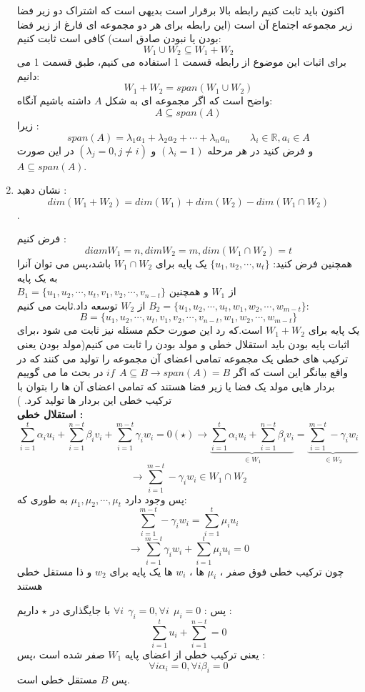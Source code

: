 \documentclass{article}
\begin{document}
\begin{enumerate}
\begin{حل}
		اکنون باید ثابت کنیم رابطه بالا برقرار است بدیهی است که اشتراک دو زیر فضا زیر مجموعه اجتماع آن است (این رابطه برای هر دو مجموعه ای فارغ از زیر فضا بودن یا نبودن صادق است) کافی است ثابت کنیم: 
		$$W_1\cup W_2\subseteq W_1+W_2$$
		برای اثبات این موضوع از رابطه قسمت 1 استفاده می کنیم، طبق قسمت 1 می دانیم: 
		$$W_1+W_2=span(W_1\cup W_2)$$
		واضح است که اگر مجموعه ای به شکل 
		$A$
		داشته باشیم آنگاه:
		$$A\subseteq span(A)$$
		زیرا :
		$$span(A)=\lambda_1a_1+\lambda_2 a_2+\cdots+\lambda_n a_n\qquad \lambda_i\in \mathbb{R},a_i\in A$$
		و فرض کنید در هر مرحله 
		$(\lambda_i=1)$
		و 
		$(\lambda_j=0 , j\neq i)$
		در این صورت 
		$A\subseteq span(A)$.
	\end{حل}
	\item 
	نشان دهید :
	$$dim(W_1+W_2)=dim(W_1)+dim(W_2)-dim(W_1\cap W_2)$$.
	\begin{حل}
	فرض کنیم :
	$$diam W_1=n,dim W_2=m,dim(W_1\cap W_2)=t$$
	همچنین فرض کنید:
	$\{u_1,u_2,\cdots,u_t\}$
یک پایه برای 
$W_1\cap W_2$
باشد،پس می توان آنرا به یک پایه 
\\
$B_1=\{u_1,u_2,\cdots,u_t,v_1,v_2,\cdots,v_{n-t}\}$
از 
$W_1$
و همچنین  
$B_2=\{u_1,u_2,\cdots,u_t,w_1,w_2,\cdots,w_{m-t}\}$
از 
$W_2$
توسعه داد.ثابت می کنیم:
$$B=\{u_1,u_2,\cdots,u_t,v_1,v_2,\cdots,v_{n-t},w_1,w_2,\cdots,w_{m-t}\}$$
یک پایه برای 
$W_1+W_2$
است.که رد این صورت حکم مسئله نیز ثابت می شود ،برای اثبات پایه بودن باید استقلال خطی و مولد بودن را ثابت می کنیم(مولد بودن یعنی ترکیب های خطی یک مجموعه تمامی اعضای آن مجموعه را تولید می کنند که در واقع بیانگر این است که اگر 
$if\ \ A\subseteq B\to span(A)=B$
در بحث ما می گوییم بردار هایی مولد یک فضا یا زیر فضا هستند که تمامی اعضای آن ها را بتوان با ترکیب خطی این  بردار ها تولید کرد.
)
	\\
	{\bf  استقلال خطی :}
	$$\sum_{i=1}^{t}\alpha_iu_i+\sum_{i=1}^{n-t}\beta_i v_i+\sum_{i=1}^{m-t}\gamma_i w_i=0(\star)\longrightarrow \underbrace{\sum_{i=1}^{t}\alpha_iu_i+\sum_{i=1}^{n-t}\beta_i v_i}_{\in W_1}=\underbrace{\sum_{i=1}^{m-t}-\gamma_i w_i}_{\in W_2} $$
	$$\longrightarrow \sum_{i=1}^{m-t}-\gamma_i w_i\in W_1\cap W_2 $$
	پس وجود دارد 
	$\mu_1,\mu_2,\cdots,\mu_t$
	به طوری که:
	$$\sum_{i=1}^{m-t}-\gamma_i w_i=\sum_{i=1}^{t}\mu_iu_i$$
	$$\longrightarrow \sum_{i=1}^{m-t}\gamma_i w_i+\sum_{i=1}^{t}\mu_iu_i=0$$
	چون ترکیب خطی فوق صفر ،
	$\mu_i$
	ها ،
	$w_i$
	ها یک پایه برای 
	$w_2$
	و ذا مستقل خطی هستند 
	
	پس :
	$\forall i\ \ \gamma_i=0,\forall i\ \ \mu_i=0$
		با جایگذاری در 
		$\star$
		داریم :
		$$\sum_{i=1}^{t}u_i+\sum_{i=1}^{n-t}=0$$
		یعنی ترکیب خطی از اعضای پایه 
		$W_1$
		صفر شده است ،پس :
		$$\forall i \alpha_i=0,\forall i \beta_i=0$$
		پس 
		$B$
		مستقل خطی است.
		

\end{حل}
\end{enumerate}
\end{document}
